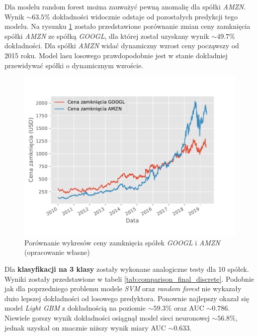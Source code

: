 \documentclass[a4paper, twoside, 11pt, openright]{article}
\begin{document}
\bigskip

Dla modelu random forest można zauważyć pewną anomalię dla spółki \textit{AMZN}. Wynik $\sim 63.5\%$ dokładności widocznie odstaje od pozostałych predykcji tego modelu. Na rysunku \ref{img:amzn_googl_adjusted_comparison} zostało przedstawione porównanie zmian ceny zamknięcia spółki \textit{AMZN} ze spółką \textit{GOOGL}, dla której został uzyskany wynik $\sim 49.7\%$ dokładności. Dla spółki \textit{AMZN} widać dynamiczny wzrost ceny począwszy od 2015 roku. Model lasu losowego prawdopodobnie jest w stanie dokładniej przewidywać spółki o dynamicznym wzroście.

\begin{figure}[H]
\centering \includegraphics[scale=1]{img/AMZN_GOOGL_close_comparison.pdf}
\caption{Porównanie wykresów ceny zamknięcia spółek \textit{GOOGL} i \textit{AMZN} (opracowanie własne)}
\label{img:amzn_googl_adjusted_comparison}
\end{figure}

\bigskip

Dla \textbf{klasyfikacji na 3 klasy} zostały wykonane analogiczne testy dla 10 spółek. Wyniki zostały przedstawione w tabeli \ref{tab:comparison_final_discrete}. Podobnie jak dla poprzedniego problemu modele \textit{SVM} oraz \textit{random forest} nie wykazały dużo lepszej dokładności od losowego predyktora. Ponownie najlepszy okazał się model \textit{Light GBM} z dokładnością na poziomie $\sim 59.3\%$ oraz AUC $\sim 0.786$. Niewiele gorszy wynik dokładności osiągnął model sieci neuronowej $\sim 56.8\%$, jednak uzyskał on znacznie niższy wynik miary AUC $\sim 0.633$.
\end{document}
